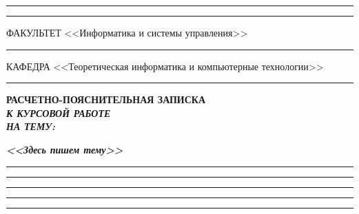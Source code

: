 \documentclass[14pt,russian]{scrartcl}
\begin{document}
\begin{titlepage}
\vspace{-2pt}
\hspace{-34.5pt}\rule{\textwidth}{2.5pt}

\vspace*{-20.3pt}
\hspace{-34.5pt}\rule{\textwidth}{0.4pt}
 
\vspace{0.5ex}
\noindent \small ФАКУЛЬТЕТ\hspace{80pt} <<Информатика и системы управления>>

\vspace*{-16pt}
\hspace{35pt}\rule{0.855\textwidth}{0.4pt}

\vspace{0.5ex}
\noindent \small КАФЕДРА\hspace{50pt} <<Теоретическая информатика и компьютерные технологии>>

\vspace*{-16pt}
\hspace{25pt}\rule{0.875\textwidth}{0.4pt}
 
 
\vspace{3em}
 
\begin{center}
\Large \bf{РАСЧЕТНО-ПОЯСНИТЕЛЬНАЯ ЗАПИСКА\\\textbf{\textit{К КУРСОВОЙ РАБОТЕ\\НА ТЕМУ:}} \\}
\end{center}

\vspace*{-6ex} 
\begin{center}
\Large{\textit{\textbf{<<Здесь пишем тему>>}}}

\vspace*{-3ex}
\rule{0.9\textwidth}{1.2pt}

\vspace*{-0.2ex}
\rule{0.9\textwidth}{1.2pt}

\vspace*{-0.2ex}
\rule{0.9\textwidth}{1.2pt}

\vspace*{-0.2ex}
\rule{0.9\textwidth}{1.2pt}

\vspace*{-0.2ex}
\rule{0.9\textwidth}{1.2pt}
\end{center}
 
\vspace{\fill}
 

\newlength{\ML}


\end{titlepage}
\end{document}
